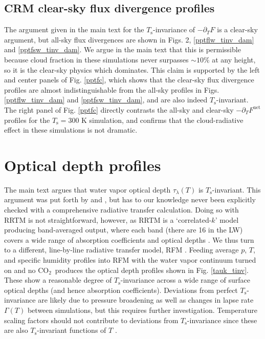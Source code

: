 \documentclass[9pt,twoside,lineno]{pnas-new}
\newcommand{\ppt}{\ensuremath{\partial_T}}
\newcommand{\cotwo}{\ensuremath{\mathrm{CO_2}}}
\newcommand{\Fnet}{\ensuremath{F^\mathrm{net}}}
\newcommand{\tauk}{\ensuremath{\tau_\lambda}}
\newcommand{\Ts}{\ensuremath{T_\mathrm{s}}}
\begin{document}
 \subsection{CRM clear-sky flux divergence profiles}
The argument given in the main text for the \Ts-invariance of $-\ppt F$ is a clear-sky argument, but all-sky flux divergences are shown in Figs. 2, \ref{pptflw_tinv_dam} and \ref{pptfsw_tinv_dam}. We argue in the main text that this is permissible because cloud fraction in these simulations never surpasses $\sim 10 \%$ at any height, so it is the clear-sky physics which dominates. This claim is supported by the left and center panels of  Fig. \ref{pptfc}, which shows that the clear-sky flux divergence profiles are almost indistinguishable from the all-sky profiles in Figs. \ref{pptflw_tinv_dam} and \ref{pptfsw_tinv_dam}, and are also indeed  \Ts-invariant. The right panel of Fig. \ref{pptfc} directly contrasts the all-sky and clear-sky $-\ppt \Fnet$ profiles for the $\Ts=300$ K simulation, and confirms that the cloud-radiative effect in these simulations is not dramatic. 

\section{Optical depth profiles}
The main text argues that water vapor optical depth $\tauk(T)$  is \Ts-invariant. This argument was put forth by \cite{simpson1928} and \cite{ingram2010}, but has to our knowledge never been explicitly checked with a comprehensive radiative transfer calculation. Doing so with RRTM  is not straightforward, however, as RRTM is a `correlated-$k$' model producing band-averaged output, where each band (there are 16 in the LW) covers a wide range of absorption coefficients and optical depths  \citep[][]{mlawer1997}. We thus turn to a different, line-by-line radiative transfer model, RFM \citep{dudhia2017}. Feeding average $p$, $T$, and specific humidity profiles into RFM with the water vapor continuum turned on and no \cotwo\ produces the optical depth profiles shown in Fig. \ref{tauk_tinv}. These show a reasonable degree of \Ts-invariance across a wide range of surface optical depths (and hence absorption coefficients). Deviations from perfect \Ts-invariance are likely due to pressure broadening as well as changes in lapse rate $\Gamma(T)$ between simulations, but this requires further investigation. Temperature scaling  factors should not contribute to deviations from \Ts-invariance since these are also \Ts-invariant functions of $T$ \citep[e.g. Eq. (4.62) of reference ][]{pierrehumbert2010}. 
\end{document}
